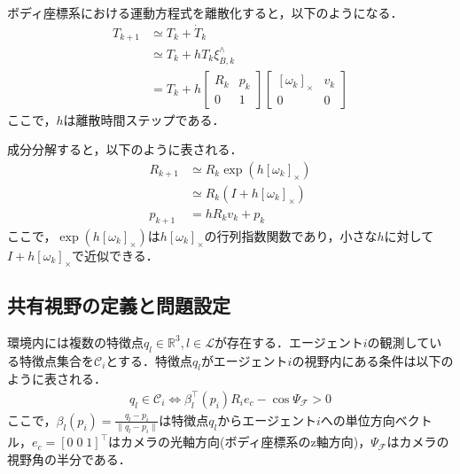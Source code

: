ボディ座標系における運動方程式を離散化すると，以下のようになる．
\begin{equation}
\begin{aligned}
T_{k+1} &\simeq T_k + \dot{T}_k \\
&\simeq T_k + h T_k \xi^\wedge_{B,k} \\
&= T_k + h \begin{bmatrix}
R_k & p_k \\
0 & 1
\end{bmatrix}
\begin{bmatrix}
[\omega_k]_\times & v_k \\
0 & 0
\end{bmatrix}
\label{eq:se3_discrete}
\end{aligned}
\end{equation}
ここで，$h$は離散時間ステップである．

成分分解すると，以下のように表される．
\begin{equation}
\begin{aligned}
R_{k+1} &\simeq R_k \exp(h[\omega_k]_{\times}) \\
&\simeq R_k(I + h[\omega_k]_{\times}) \\
p_{k+1} &= h R_k v_k + p_k
\label{eq:se3_discrete_components}
\end{aligned}
\end{equation}
ここで，$\exp(h[\omega_k]_{\times})$は$h[\omega_k]_{\times}$の行列指数関数であり，小さな$h$に対して$I + h[\omega_k]_{\times}$で近似できる．

\subsection{共有視野の定義と問題設定}

環境内には複数の特徴点$q_l \in \mathbb{R}^3, l \in \mathcal{L}$が存在する．エージェント$i$の観測している特徴点集合を$\mathcal{C}_i$とする．特徴点$q_l$がエージェント$i$の視野内にある条件は以下のように表される．
\begin{equation}
\begin{aligned}
q_l \in \mathcal{C}_i \iff \beta_l^{\top}(p_i)R_i e_c - \cos\Psi_\mathcal{F} > 0
\label{eq:fov_condition}
\end{aligned}
\end{equation}
ここで，$\beta_l(p_i) = \frac{q_l - p_i}{\|q_l - p_i\|}$は特徴点$q_l$からエージェント$i$への単位方向ベクトル，$e_c = [0 \; 0 \; 1]^\top$はカメラの光軸方向(ボディ座標系のz軸方向)，$\Psi_\mathcal{F}$はカメラの視野角の半分である．


